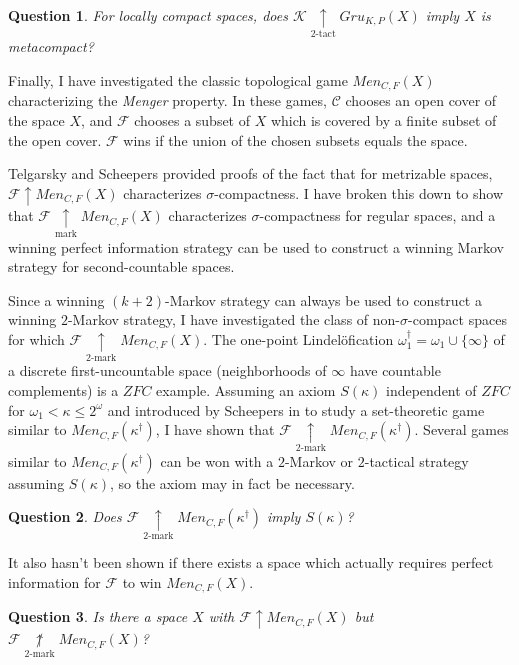\documentclass[11pt]{amsart}
\theoremstyle{plain}
\newtheorem{question}{Question}
\newcommand{\win}{\uparrow}
\newcommand{\markwin}{\underset{\text{mark}}{\uparrow}}
\newcommand{\kmarkwin}[1]{\underset{#1\text{-mark}}{\uparrow}}
\newcommand{\ktactwin}[1]{\underset{#1\text{-tact}}{\uparrow}}
\newcommand{\notkmarkwin}[1]{\underset{#1\text{-mark}}{\not\uparrow}}
\newcommand{\oneptlind}[1]{#1^\dagger}
\newcommand{\gruKPGame}[1]{Gru_{K,P}(#1)}
\newcommand{\menGame}[1]{Men_{C,F}(#1)}
\newcommand{\<}{\langle}
\renewcommand{\>}{\rangle}
\newcommand{\alcompS}[1]{S(#1)}
\newcommand{\pl}[1]{\mathscr{#1}}
\newcommand{\term}{\textit}
\begin{document}
\begin{question}
  For locally compact spaces,
  does $\pl K\ktactwin{2}\gruKPGame{X}$ imply
  $X$ is metacompact?
\end{question}

Finally, I have investigated the classic topological game $\menGame{X}$
characterizing the \term{Menger} property.
In these games, $\pl C$ chooses an open cover of the space $X$,
and $\pl F$ chooses a subset of $X$ which is covered by a
finite subset of the open cover. $\pl F$ wins if the union of the chosen
subsets equals the space.

Telgarsky \cite{MR753073} and Scheepers \cite{MR1273523} provided proofs of
the fact that for metrizable spaces, $\pl F\win\menGame{X}$
characterizes $\sigma$-compactness. I have broken this down to show that
$\pl F\markwin\menGame{X}$ characterizes $\sigma$-compactness for regular
spaces, and a winning perfect information strategy can be used to construct
a winning Markov strategy for second-countable spaces.

Since a winning $(k+2)$-Markov strategy can always be used to construct a
winning $2$-Markov strategy, I have investigated the class of
non-$\sigma$-compact spaces for which $\pl F\kmarkwin{2}\menGame{X}$.
The one-point Lindel\"ofication $\oneptlind\omega_1=\omega_1\cup\{\infty\}$
of a discrete first-uncountable space (neighborhoods of $\infty$ have countable
complements) is a $ZFC$ example. Assuming an axiom $\alcompS\kappa$
independent of $ZFC$ for $\omega_1<\kappa\leq 2^\omega$
and introduced by Scheepers in \cite{MR1129143}
to study a set-theoretic game similar to $\menGame{\oneptlind\kappa}$,
I have shown that $\pl F\kmarkwin{2}\menGame{\oneptlind\kappa}$. Several
games similar to $\menGame{\oneptlind\kappa}$ can be won with a $2$-Markov
or $2$-tactical strategy assuming $\alcompS\kappa$, so the axiom may in fact be
necessary.

\begin{question}
  Does $\pl F\kmarkwin{2}\menGame{\oneptlind\kappa}$ imply $\alcompS\kappa$?
\end{question}

It also hasn't been shown if there exists a space which actually requires
perfect information for $\pl F$ to win $\menGame{X}$.

\begin{question}
  Is there a space $X$ with $\pl F\win\menGame{X}$ but
  $\pl F\notkmarkwin{2}\menGame{X}$?
\end{question}
\end{document}
